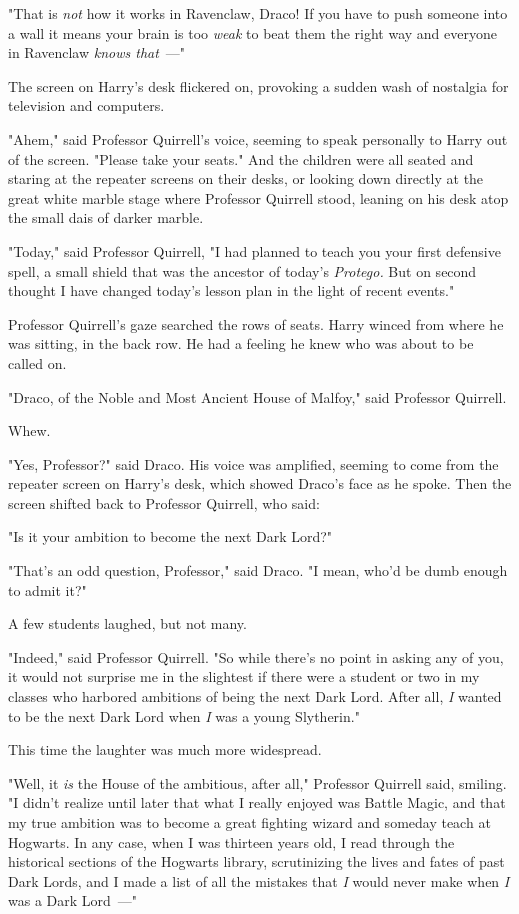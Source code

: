"That is \emph{not} how it works in Ravenclaw, Draco! If you have to push
someone into a wall it means your brain is too \emph{weak} to beat them the
right way and everyone in Ravenclaw \emph{knows that}~---"

The screen on Harry's desk flickered on, provoking a sudden wash of nostalgia
for television and computers.

"Ahem," said Professor Quirrell's voice, seeming to speak personally to Harry
out of the screen. "Please take your seats."
\sbreak
And the children were all seated and staring at the repeater screens on their
desks, or looking down directly at the great white marble stage where Professor
Quirrell stood, leaning on his desk atop the small dais of darker marble.

"Today," said Professor Quirrell, "I had planned to teach you your first
defensive spell, a small shield that was the ancestor of today's
\emph{Protego.} But on second thought I have changed today's lesson plan in the
light of recent events."

Professor Quirrell's gaze searched the rows of seats. Harry winced from where
he was sitting, in the back row. He had a feeling he knew who was about to be
called on.

"Draco, of the Noble and Most Ancient House of Malfoy," said Professor Quirrell.

Whew.

"Yes, Professor?" said Draco. His voice was amplified, seeming to come from the
repeater screen on Harry's desk, which showed Draco's face as he spoke. Then
the screen shifted back to Professor Quirrell, who said:

"Is it your ambition to become the next Dark Lord?"

"That's an odd question, Professor," said Draco. "I mean, who'd be dumb enough
to admit it?"

A few students laughed, but not many.

"Indeed," said Professor Quirrell. "So while there's no point in asking any of
you, it would not surprise me in the slightest if there were a student or two
in my classes who harbored ambitions of being the next Dark Lord. After all,
\emph{I} wanted to be the next Dark Lord when \emph{I} was a young Slytherin."

This time the laughter was much more widespread.

"Well, it \emph{is} the House of the ambitious, after all," Professor Quirrell
said, smiling. "I didn't realize until later that what I really enjoyed was
Battle Magic, and that my true ambition was to become a great fighting wizard
and someday teach at Hogwarts. In any case, when I was thirteen years old, I
read through the historical sections of the Hogwarts library, scrutinizing the
lives and fates of past Dark Lords, and I made a list of all the mistakes that
\emph{I} would never make when \emph{I} was a Dark Lord~---"

